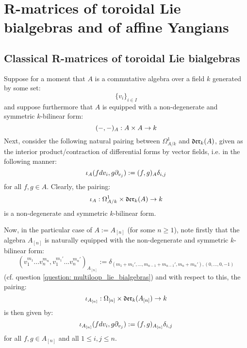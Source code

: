 \section{R-matrices of toroidal Lie bialgebras and of affine Yangians}
    \subsection{Classical R-matrices of toroidal Lie bialgebras}
        \begin{remark} \label{remark: pairing_1_forms_and_vector_fields} 
            Suppose for a moment that $A$ is a commutative algebra over a field $k$ generated by some set:
                $$\{v_i\}_{i \in I}$$
            and suppose furthermore that $A$ is equipped with a non-degenerate and symmetric $k$-bilinear form:
                $$(-, -)_A: A \x A \to k$$
            Next, consider the following natural pairing between $\Omega^1_{A/k}$ and $\mathfrak{der}_k(A)$, given as the interior product/contraction of differential forms by vector fields, i.e. in the following manner:
                $$\iota_A(f dv_i, g \partial_{v_j}) := (f, g)_A \delta_{i, j}$$
            for all $f, g \in A$. Clearly, the pairing:
                $$\iota_A: \Omega^1_{A/k} \x \der_k(A) \to k$$
            is a non-degenerate and symmetric $k$-bilinear form.

            Now, in the particular case of $A := A_{[n]}$ (for some $n \geq 1$), note firstly that the algebra $A_{[n]}$ is naturally equipped with the non-degenerate and symmetric $k$-bilinear form:
                $$(v_1^{m_1} ... v_n^{m_n}, v_1^{m_1'} ... v_n^{m_n'})_{A_{[n]}} := \delta_{(m_1 + m_1', ..., m_{n - 1} + m_{n - 1}', m_n + m_n'), (0, ..., 0, -1)}$$
            (cf. question \ref{question: multiloop_lie_bialgebras}) and with respect to this, the pairing:
                $$\iota_{A_{[n]}}: \Omega_{[n]} \x \der_k(A_{[n]}) \to k$$
            is then given by:
                $$\iota_{A_{[n]}}(f dv_i, g \partial_{v_j}) := (f, g)_{A_{[n]}} \delta_{i, j}$$
            for all $f, g \in A_{[n]}$ and all $1 \leq i, j \leq n$. 
        \end{remark}

